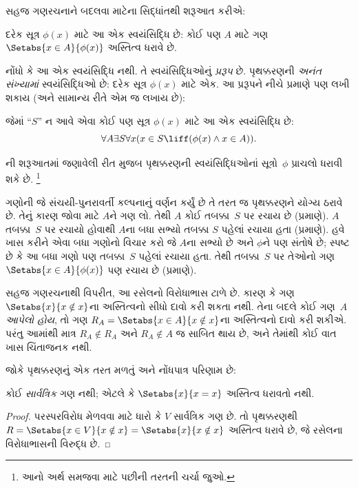 સહજ ગણરચનાને બદલવા માટેના સિદ્ધાંતથી શરૂઆત કરીએ:

\begin{axiom}[પૃથક્કરણનું પ્રરૂપ]
દરેક સૂત્ર $\phi(x)$ માટે આ એક સ્વયંસિદ્ધિ છે: કોઈ પણ $A$ માટે
ગણ $\Setabs{x \in A}{\phi(x)}$ અસ્તિત્વ ધરાવે છે.
\end{axiom}

નોંધો કે આ એક સ્વયંસિદ્ધિ નથી. તે સ્વયંસિદ્ધિઓનું \emph{પ્રરૂપ}
છે. પૃથક્કરણની \emph{અનંત સંખ્યામાં} સ્વયંસિદ્ધિઓ છે: દરેક સૂત્ર
$\phi(x)$ માટે એક. આ પ્રરૂપને નીચે પ્રમાણે પણ લખી શકાય
(અને સામાન્ય રીતે એમ જ લખાય છે):

\begin{defish}
જેમાં ``$S$'' ન આવે એવા કોઈ પણ સૂત્ર $\phi(x)$ માટે આ એક
સ્વયંસિદ્ધિ છે:
\[
\forall A \exists S \forall x(x \in S \liff (\phi(x) \land x \in A)).
\]
\end{defish}

ની શરૂઆતમાં જણાવેલી રીત મુજબ પૃથક્કરણની
સ્વયંસિદ્ધિઓનાં સૂત્રો~$\phi$ પ્રાચલો ધરાવી શકે છે.
\footnote{આનો અર્થ સમજવા માટે
 પછીની તરતની
ચર્ચા જુઓ.}

ગણોની જે સંચયી-પુનરાવર્તી કલ્પનાનું વર્ણન કર્યું છે તે તરત જ
પૃથક્કરણને યોગ્ય ઠરાવે છે. તેનું કારણ જોવા માટે $A$ને ગણ લો.
તેથી $A$ કોઈ તબક્કા~$S$ પર રચાય છે (\stageshier પ્રમાણે).
$A$ તબક્કા~$S$ પર રચાયો હોવાથી $A$ના બધા સભ્યો તબક્કા $S$
પહેલાં રચાયા હતા (\stagesacc પ્રમાણે). હવે ખાસ કરીને એવા બધા
ગણોનો વિચાર કરો જે $A$ના સભ્યો છે અને $\phi$ને પણ સંતોષે છે;
સ્પષ્ટ છે કે આ બધા ગણો પણ તબક્કા~$S$ પહેલાં રચાયા હતા.
તેથી તબક્કા~$S$ પર તેઓનો ગણ $\Setabs{x \in A}{\phi(x)}$
પણ રચાય છે (\stagesacc પ્રમાણે).

સહજ ગણરચનાથી વિપરીત, આ રસેલનો વિરોધાભાસ ટાળે છે. કારણ કે
ગણ $\Setabs{x}{x \notin
x}$ના અસ્તિત્વનો સીધો દાવો કરી શકતા નથી. તેના બદલે કોઈ
ગણ~$A$ \emph{આપેલો હોય}, તો ગણ
$R_A = \Setabs{x \in A}{x \notin x}$ના અસ્તિત્વનો દાવો કરી
શકીએ. પરંતુ આમાંથી માત્ર $R_A \notin R_A$ અને $R_A \notin A$
જ સાબિત થાય છે, અને તેમાંથી કોઈ વાત ખાસ ચિંતાજનક નથી.

જોકે પૃથક્કરણનું એક તરત મળતું અને નોંધપાત્ર પરિણામ છે:

\begin{thm}
કોઈ \emph{સાર્વત્રિક} ગણ નથી; એટલે કે $\Setabs{x}{x = x}$
અસ્તિત્વ ધરાવતો નથી.
\end{thm}

\begin{proof}
પરસ્પરવિરોધ મેળવવા માટે ધારો કે $V$ સાર્વત્રિક ગણ છે. તો
પૃથક્કરણથી $R =
\Setabs{x \in V}{x \notin x} = \Setabs{x}{x \notin x}$ અસ્તિત્વ
ધરાવે છે, જે રસેલના વિરોધાભાસની વિરુદ્ધ છે.
\end{proof}

